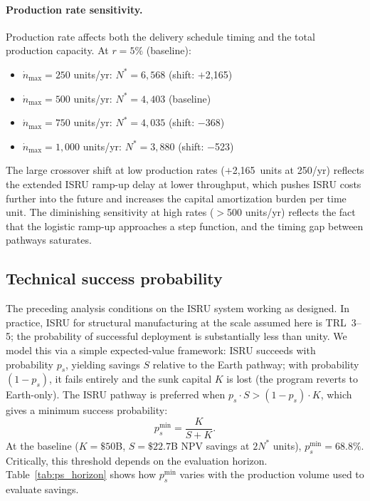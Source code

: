 \documentclass[preprint,12pt]{elsarticle}
\begin{document}
\paragraph{Production rate sensitivity.} Production rate affects both the delivery schedule timing and the total production capacity. At $r = 5\%$ (baseline):

\begin{itemize}
\item $\dot{n}_{\max} = 250$ units/yr: $N^* = 6{,}568$ (shift: $+$2{,}165)
\item $\dot{n}_{\max} = 500$ units/yr: $N^* = 4{,}403$ (baseline)
\item $\dot{n}_{\max} = 750$ units/yr: $N^* = 4{,}035$ (shift: $-$368)
\item $\dot{n}_{\max} = 1{,}000$ units/yr: $N^* = 3{,}880$ (shift: $-$523)
\end{itemize}

The large crossover shift at low production rates ($+$2{,}165~units at 250/yr) reflects the extended ISRU ramp-up delay at lower throughput, which pushes ISRU costs further into the future and increases the capital amortization burden per time unit. The diminishing sensitivity at high rates ($>$500 units/yr) reflects the fact that the logistic ramp-up approaches a step function, and the timing gap between pathways saturates.

\subsection{Technical success probability}
\label{sec:success_probability}

The preceding analysis conditions on the ISRU system working as designed. In practice, ISRU for structural manufacturing at the scale assumed here is TRL~3--5; the probability of successful deployment is substantially less than unity. We model this via a simple expected-value framework: ISRU succeeds with probability $p_s$, yielding savings $S$ relative to the Earth pathway; with probability $(1 - p_s)$, it fails entirely and the sunk capital $K$ is lost (the program reverts to Earth-only). The ISRU pathway is preferred when $p_s \cdot S > (1 - p_s) \cdot K$, which gives a minimum success probability:
\begin{equation}
  p_s^{\min} = \frac{K}{S + K}.
  \label{eq:p_success}
\end{equation}
At the baseline ($K = \$50$B, $S = \$22.7$B NPV savings at $2N^*$ units), $p_s^{\min} = 68.8\%$. Critically, this threshold depends on the evaluation horizon. Table~\ref{tab:ps_horizon} shows how $p_s^{\min}$ varies with the production volume used to evaluate savings.
\end{document}
